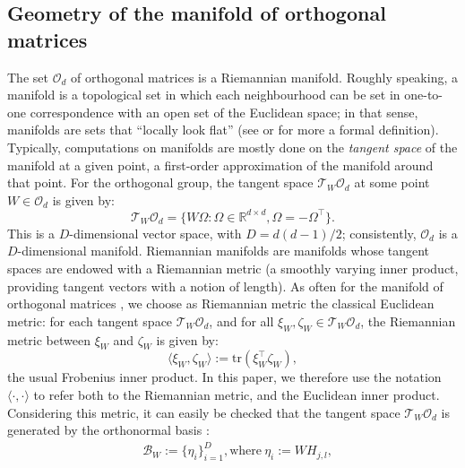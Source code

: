 \documentclass{article}
\def \R {\mathbb{R}}
\def \O {\mathcal{O}}
\newcommand{\tr}[1]{\mathrm{tr}\left(#1 \right)}
\begin{document}
\subsection{Geometry of the manifold of orthogonal matrices} \label{sec:geometry}
The set $\mathcal{O}_d$ of orthogonal matrices is a Riemannian manifold. Roughly speaking, a manifold is a topological set in which each neighbourhood can be set in one-to-one correspondence with an open set of the Euclidean space; in that sense, manifolds are sets that ``locally look flat'' (see \cite{AMS2008} or \cite{boumal2020intromanifolds} for more a formal definition). Typically, computations on manifolds are mostly done on the \emph{tangent space} of the manifold at a given point, a first-order approximation of the manifold around that point. For the orthogonal group, the tangent space $\mathcal{T}_W \mathcal{O}_d$  at some point $W \in \mathcal{O}_d$ is given by:
\begin{equation} \label{eq: tgSpace}
    \mathcal{T}_{W} \mathcal{O}_d = \{ W \Omega : \Omega \in \R^{d \times d}, \Omega = - \Omega^\top \}.
\end{equation}
This is a $D$-dimensional vector space, with $D = d(d-1)/2$; consistently, $\O_d$ is a $D$-dimensional manifold. Riemannian manifolds are manifolds whose tangent spaces are endowed with a Riemannian metric (a smoothly varying inner product, providing tangent vectors with a notion of length). As often for the manifold of orthogonal matrices \cite{AMS2008}, we choose as Riemannian metric the classical Euclidean metric: for each tangent space $\mathcal{T}_W \mathcal{O}_d$, and for all $\xi_W, \zeta_W \in \mathcal{T}_W \mathcal{O}_d$, the Riemannian metric between $\xi_W$ and $\zeta_W$ is given by: 
\begin{equation} \label{eq:metric}
    \langle \xi_{W}, \zeta_W\rangle := \tr{\xi_W^\top \zeta_W},
\end{equation}
the usual Frobenius inner product. In this paper, we therefore use the notation $\langle \cdot, \cdot \rangle$ to refer both to the Riemannian metric, and the Euclidean inner product. Considering this metric, it can easily be checked that the tangent space $\mathcal{T}_W \O_d$ is generated by the orthonormal basis \cite{Shalit2014}:
\begin{equation} 
\label{eq: basis}
\begin{aligned}
&\mathcal{B}_W := \{ \eta_i\}_{i = 1}^{D}, \text{where} \ \eta_{i} := W H_{j,l},
\end{aligned}
\end{equation}
\end{document}
